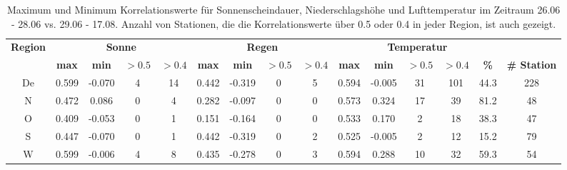 \documentclass[11pt]{article}
\begin{document}
\begin{landscape}
\begin{table*}
\centering   
\caption{Maximum und Minimum Korrelationswerte f\"ur Sonnenscheindauer, Niederschlagsh\"ohe und Lufttemperatur im Zeitraum 26.06 - 28.06 vs. 29.06 - 17.08. Anzahl von Stationen, die die Korrelationswerte \"uber 0.5 oder 0.4 in jeder Region, ist auch gezeigt. \\} 
\label{tab:}  
\renewcommand{\arraystretch}{1.3}
 \begin{small}
\begin{tabular}{ccccc|cccc|ccccc|c}
  \toprule
   \multicolumn{1}{r}{\multirow{2}{1.2cm}{\textbf{Region}}}
 & \multicolumn{4}{c|}{\textbf{Sonne}}
& \multicolumn{4}{c|}{\textbf{Regen}}
& \multicolumn{5}{c|}{\textbf{Temperatur}} \\
\cline{2-15} 
 & \textbf{max} & \textbf{min} & \textbf{$>0.5$} & \textbf{$>0.4$} & \textbf{max} & \textbf{min} & \textbf{$>0.5$} & \textbf{$>0.4$} & \textbf{max} & \textbf{min} & \textbf{$>0.5$} & \textbf{$>0.4$} & \textbf{\%} &  \textbf{\# Station} \\ 
  \midrule
De & 0.599 & -0.070 & 4 & 14 & 0.442 & -0.319 & 0 & 5 & 0.594 & -0.005 & 31 & 101 & 44.3  & 228 \\ 
  N & 0.472 & 0.086 & 0 & 4 & 0.282 & -0.097 & 0 & 0 & 0.573 & 0.324 & 17 & 39 &  81.2 & 48  \\ 
  O & 0.409 & -0.053 & 0 & 1 & 0.151 & -0.164 & 0 & 0 & 0.533 & 0.170 & 2 & 18 &  38.3 & 47  \\ 
  S & 0.447 & -0.070 & 0 & 1 & 0.442 & -0.319 & 0 & 2 & 0.525 & -0.005 & 2 & 12 &15.2 & 79   \\ 
  W & 0.599 & -0.006 & 4 & 8 & 0.435 & -0.278 & 0 & 3 & 0.594 & 0.288 & 10 & 32 &  59.3  &54 \\ 
   \bottomrule
\end{tabular}
\end{small}
\end{table*}

\end{landscape}

\vspace{5cm}
\end{document}
